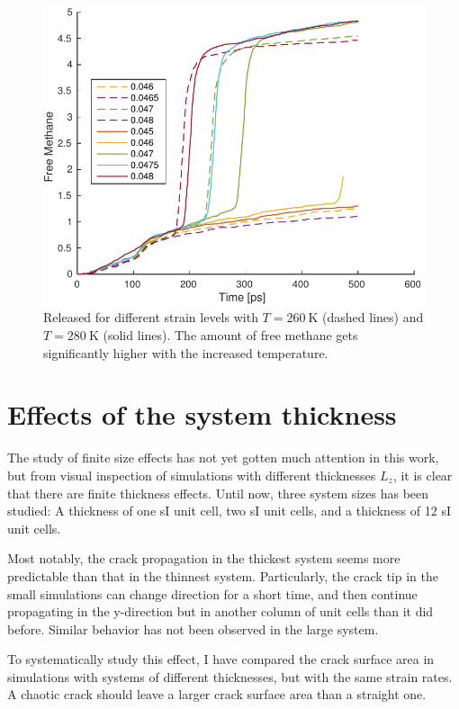 \begin{figure}
\centering
\includegraphics[width=12cm]{../figures/thesis/released_methane_temp.pdf}
\caption{Released for different strain levels with $T = \SI{260}{\kelvin}$ (dashed lines) and $T = \SI{280}{\kelvin}$ (solid lines). The amount of free methane gets significantly higher with the increased temperature.}
\label{fig:released_methane_temp}
\end{figure}

\section{Effects of the system thickness}
The study of finite size effects has not yet gotten much attention in this work, but from visual inspection of simulations with different thicknesses $L_z$, it is clear that there are finite thickness effects. Until now, three system sizes has been studied: A thickness of one sI unit cell, two sI unit cells, and a thickness of 12 sI unit cells. 

Most notably, the crack propagation in the thickest system seems more predictable than that in the thinnest system. Particularly, the crack tip in the small simulations can change direction for a short time, and then continue propagating in the y-direction but in another column of unit cells than it did before. Similar behavior has not been observed in the large system.

To systematically study this effect, I have compared the crack surface area in simulations with systems of different thicknesses, but with the same strain rates. A chaotic crack should leave a larger crack surface area than a straight one.

